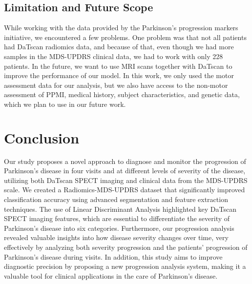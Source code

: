 \documentclass[twocolumn]{article}
\begin{document}
\subsection{Limitation and Future Scope}
While working with the data provided by the Parkinson's progression markers initiative, we encountered a few problems. One problem was that not all patients had DaTscan radiomics data, and because of that, even though we had more samples in the MDS-UPDRS clinical data, we had to work with only 228 patients.
In the future, we want to use MRI scans together with DaTscan to improve the performance of our model. In this work, we only used the motor assessment data for our analysis, but we also have access to the non-motor assessment of PPMI, medical history, subject characteristics, and genetic data, which we plan to use in our future work.


\section{Conclusion}
\label{Conclusion}

Our study proposes a novel approach to diagnose and monitor the progression of Parkinson's disease in four visits and at different levels of severity of the disease, utilizing both DaTscan SPECT imaging and clinical data from the MDS-UPDRS scale. We created a Radiomics-MDS-UPDRS dataset that significantly improved classification accuracy using advanced segmentation and feature extraction techniques. The use of Linear Discriminant Analysis highlighted key DaTscan SPECT imaging features, which are essential to differentiate the severity of Parkinson's disease into six categories. Furthermore, our progression analysis revealed valuable insights into how disease severity changes over time, very effectively by analyzing both severity progression and the patients' progression of Parkinson's disease during visits. In addition, this study aims to improve diagnostic precision by proposing a new progression analysis system, making it a valuable tool for clinical applications in the care of Parkinson's disease.
\end{document}
